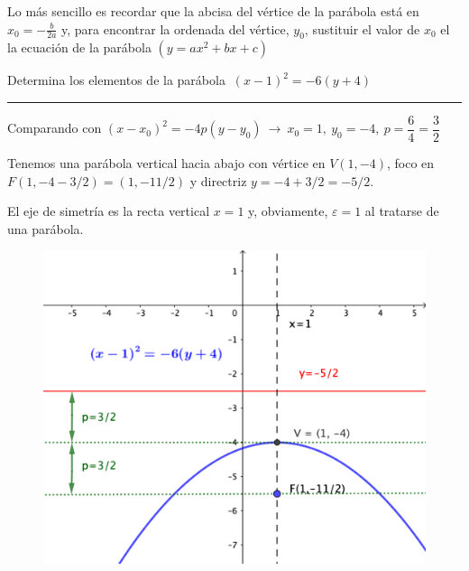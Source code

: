 \textcolor{gris}{Lo más sencillo es recordar que la abcisa del vértice de la parábola está en $x_0=-\frac{b}{2a}$ y, para encontrar la ordenada del vértice, $y_0$, sustituir el valor de $x_0$ el la ecuación de la parábola $(y=ax^2+bx+c)$}

\vspace{5mm}
\begin{miejercicio}

Determina los elementos de la parábola $\ (x-1)^2=-6(y+4)$

\rule{250pt}{0.1pt}

\vspace{2mm} 

\begin{multicols}{2}
Comparando con $(x-x_0)^2=-4p(y-y_0) \ \to \ x_0=1,\ y_0=-4,\ p=\dfrac 6 4 = \dfrac 3 2$

\vspace{3mm} Tenemos una parábola vertical hacia abajo con vértice en $V(1,-4)$, foco en $F(1,-4-3/2)=(1,-11/2)$ y directriz $y=-4+3/2=-5/2$. 

\vspace{3mm}El eje de simetría es la recta vertical $x=1$ y, obviamente, $\varepsilon=1$ al tratarse de una parábola.
\begin{figure}[H]
	\centering
	\includegraphics[width=.5\textwidth]{img-conicas/conicas37.png}
	\end{figure}	
\end{multicols}	
	
\end{miejercicio}

